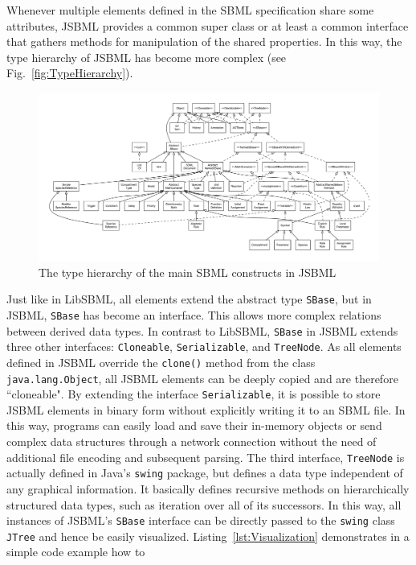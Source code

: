 \documentclass[
  letterpaper,
  11pt,
  headsepline,
  pointlessnumbers,
  tablecaptionabove,
  headinclude,
  appendixprefix,
  idxtotoc,
  bibtotoc,
  titlepage
]{scrartcl}
\begin{document}
Whenever multiple elements defined in the SBML specification share some
attributes, JSBML provides a common super class or at least a common interface
that gathers methods for manipulation of the shared properties. In this way, the
type hierarchy of JSBML has become more complex (see
Fig.~\vref{fig:TypeHierarchy}).
\begin{figure}
\centering
\includegraphics[width=\textwidth]{FullTypeHierarchy.pdf}
\caption[The type hierarchy in JSBML]{The type hierarchy of the main SBML
constructs in JSBML}
\label{fig:TypeHierarchy}
\end{figure}
Just like in LibSBML, all elements extend the abstract type \verb!SBase!, but in
JSBML, \verb!SBase! has become an interface. This allows more complex relations
between derived data types. In contrast to LibSBML, \verb!SBase! in JSBML
extends three other interfaces: \verb!Cloneable!, \verb!Serializable!, and
\verb!TreeNode!. As all elements defined in JSBML override the \verb!clone()!
method from the class \verb!java.lang.Object!, all JSBML elements can be deeply
copied and are therefore ``cloneable". By extending the interface
\verb!Serializable!, it is possible to store JSBML elements in binary form
without explicitly writing it to an SBML file. In this way, programs can easily
load and save their in-memory objects or send complex data structures
through a network connection without the need of additional file encoding and
subsequent parsing. The third interface, \verb!TreeNode! is actually defined in
Java's \verb!swing! package, but defines a data type independent of any
graphical information. It basically defines recursive methods on hierarchically
structured data types, such as iteration over all of its successors. In this
way, all instances of JSBML's \verb!SBase! interface can be directly passed to
the \verb!swing! class \verb!JTree! and hence be easily visualized.
Listing~\vref{lst:Visualization} demonstrates in a simple code example how to
\end{document}
